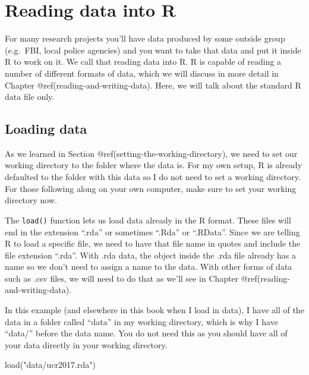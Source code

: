 \documentclass[
  a4paper,
]{krantz}
\makeatletter
\newenvironment{Shaded}{\begin{snugshade}}{\end{snugshade}}
\newcommand{\FunctionTok}[1]{\textcolor[rgb]{0.00,0.00,0.00}{#1}}
\newcommand{\NormalTok}[1]{#1}
\newcommand{\StringTok}[1]{\textcolor[rgb]{0.31,0.60,0.02}{#1}}
\newenvironment{kframe}{%
\medskip{}
\setlength{\fboxsep}{.8em}
 \def\at@end@of@kframe{}%
 \ifinner\ifhmode%
  \def\at@end@of@kframe{\end{minipage}}%
  \begin{minipage}{\columnwidth}%
 \fi\fi%
 \def\FrameCommand##1{\hskip\@totalleftmargin \hskip-\fboxsep
 \colorbox{shadecolor}{##1}\hskip-\fboxsep
     \hskip-\linewidth \hskip-\@totalleftmargin \hskip\columnwidth}%
 \MakeFramed {\advance\hsize-\width
   \@totalleftmargin\z@ \linewidth\hsize
   \@setminipage}}%
 {\par\unskip\endMakeFramed%
 \at@end@of@kframe}
\renewenvironment{Shaded}{\begin{kframe}}{\end{kframe}}
\makeatother
\begin{document}
\hypertarget{reading-data-into-r}{%
\section{Reading data into R}\label{reading-data-into-r}}

For many research projects you'll have data produced by some
outside group (e.g.~FBI, local police agencies) and you want
to take that data and put it inside R to work on it. We call
that reading data into R. R is capable of reading a number
of different formats of data, which we will discuss in more
detail in Chapter @ref(reading-and-writing-data). Here, we
will talk about the standard R data file only.

\hypertarget{loading-data-intro}{%
\subsection{Loading data}\label{loading-data-intro}}

As we learned in Section
@ref(setting-the-working-directory), we need to set our
working directory to the folder where the data is. For my
own setup, R is already defaulted to the folder with this
data so I do not need to set a working directory. For those
following along on your own computer, make sure to set your
working directory now.

The \texttt{load()} function lets us load data already in
the R format. These files will end in the extension ``.rda''
or sometimes ``.Rda'' or ``.RData''. Since we are telling R
to load a specific file, we need to have that file name in
quotes and include the file extension ``.rda''. With .rda
data, the object inside the .rda file already has a name so
we don't need to assign a name to the data. With other forms
of data such as .csv files, we will need to do that as we'll
see in Chapter @ref(reading-and-writing-data).

In this example (and elsewhere in this book when I load in
data), I have all of the data in a folder called ``data'' in
my working directory, which is why I have ``data/'' before
the data name. You do not need this as you should have all
of your data directly in your working directory.

\begin{Shaded}
\begin{Highlighting}[]
\FunctionTok{load}\NormalTok{(}\StringTok{"data/ucr2017.rda"}\NormalTok{)}
\end{Highlighting}
\end{Shaded}
\end{document}
